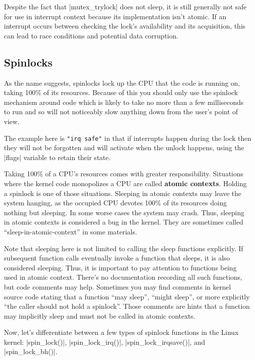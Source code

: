 \documentclass[10pt, oneside]{book}
\begin{document}
Despite the fact that \cpp|mutex_trylock| does not sleep,
it is still generally not safe for use in interrupt context because its implementation isn't atomic.
If an interrupt occurs between checking the lock's availability and its acquisition,
this can lead to race conditions and potential data corruption.

\subsection{Spinlocks}
\label{sec:spinlock}
As the name suggests, spinlocks lock up the CPU that the code is running on, taking 100\% of its resources.
Because of this you should only use the spinlock mechanism around code which is likely to take no more than a few milliseconds to run and so will not noticeably slow anything down from the user's point of view.

The example here is \verb|"irq safe"| in that if interrupts happen during the lock then they will not be forgotten and will activate when the unlock happens, using the \cpp|flags| variable to retain their state.


Taking 100\% of a CPU's resources comes with greater responsibility.
Situations where the kernel code monopolizes a CPU are called \textbf{atomic contexts}.
Holding a spinlock is one of those situations.
Sleeping in atomic contexts may leave the system hanging, as the occupied CPU devotes 100\% of its resources doing nothing but sleeping.
In some worse cases the system may crash.
Thus, sleeping in atomic contexts is considered a bug in the kernel.
They are sometimes called ``sleep-in-atomic-context'' in some materials.

Note that sleeping here is not limited to calling the sleep functions explicitly.
If subsequent function calls eventually invoke a function that sleeps, it is also considered sleeping.
Thus, it is important to pay attention to functions being used in atomic context.
There's no documentation recording all such functions, but code comments may help.
Sometimes you may find comments in kernel source code stating that a function ``may sleep'', ``might sleep'', or more explicitly ``the caller should not hold a spinlock''.
Those comments are hints that a function may implicitly sleep and must not be called in atomic contexts.

Now, let's differentiate between a few types of spinlock functions in the Linux kernel: \cpp|spin_lock()|, \cpp|spin_lock_irq()|, \cpp|spin_lock_irqsave()|, and \cpp|spin_lock_bh()|.
\end{document}
